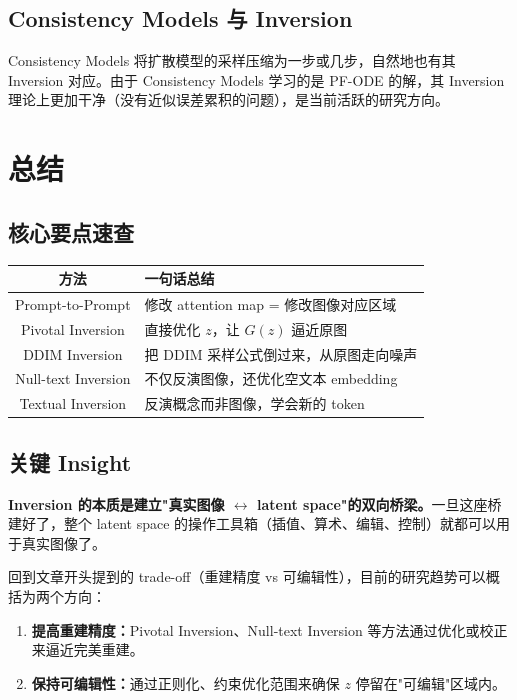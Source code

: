 \documentclass[11pt,a4paper]{article}
\theoremstyle{definition}
\begin{document}
\subsection{Consistency Models 与 Inversion}

Consistency Models 将扩散模型的采样压缩为一步或几步，自然地也有其 Inversion 对应。由于 Consistency Models 学习的是 PF-ODE 的解，其 Inversion 理论上更加干净（没有近似误差累积的问题），是当前活跃的研究方向。


\section{总结}

\subsection*{核心要点速查}

\begin{center}
\begin{tabular}{c|l}
    \toprule
    \textbf{方法} & \textbf{一句话总结} \\
    \midrule
    Prompt-to-Prompt & 修改 attention map = 修改图像对应区域 \\
    Pivotal Inversion & 直接优化 $z$，让 $G(z)$ 逼近原图 \\
    DDIM Inversion & 把 DDIM 采样公式倒过来，从原图走向噪声 \\
    Null-text Inversion & 不仅反演图像，还优化空文本 embedding \\
    Textual Inversion & 反演概念而非图像，学会新的 token \\
    \bottomrule
\end{tabular}
\end{center}

\subsection*{关键 Insight}

\textbf{Inversion 的本质是建立"真实图像 $\leftrightarrow$ latent space"的双向桥梁。}一旦这座桥建好了，整个 latent space 的操作工具箱（插值、算术、编辑、控制）就都可以用于真实图像了。

回到文章开头提到的 trade-off（重建精度 vs 可编辑性），目前的研究趋势可以概括为两个方向：

\begin{enumerate}
    \item \textbf{提高重建精度：}Pivotal Inversion、Null-text Inversion 等方法通过优化或校正来逼近完美重建。
    \item \textbf{保持可编辑性：}通过正则化、约束优化范围来确保 $z$ 停留在"可编辑"区域内。
\end{enumerate}
\end{document}
